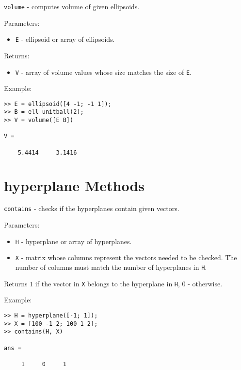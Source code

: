 \newpage

{\Large {\tt volume}} - computes volume of given ellipsoids.

Parameters:
\begin{itemize}
\item {\tt E} - ellipsoid or array of ellipsoids.
\end{itemize}

Returns:
\begin{itemize}
\item {\tt V} - array of volume values whose size matches the size of {\tt E}.
\end{itemize}

Example:
{\tt \begin{verbatim}
>> E = ellipsoid([4 -1; -1 1]);
>> B = ell_unitball(2);
>> V = volume([E B])

V =

    5.4414     3.1416
\end{verbatim} }
















\newpage













\section{hyperplane Methods}
{\Large {\tt contains}} - checks if the hyperplanes contain given vectors.

Parameters:
\begin{itemize}
\item {\tt H} - hyperplane or array of hyperplanes.
\item {\tt X} - matrix whose columns represent the vectors needed to be checked.
The number of columns must match the number of hyperplanes in {\tt H}.
\end{itemize}

Returns $1$ if the vector in {\tt X} belongs to the hyperplane in {\tt H},
$0$ - otherwise.

Example:
{\tt \begin{verbatim}
>> H = hyperplane([-1; 1]);
>> X = [100 -1 2; 100 1 2];
>> contains(H, X)

ans =

     1     0     1
\end{verbatim} }


